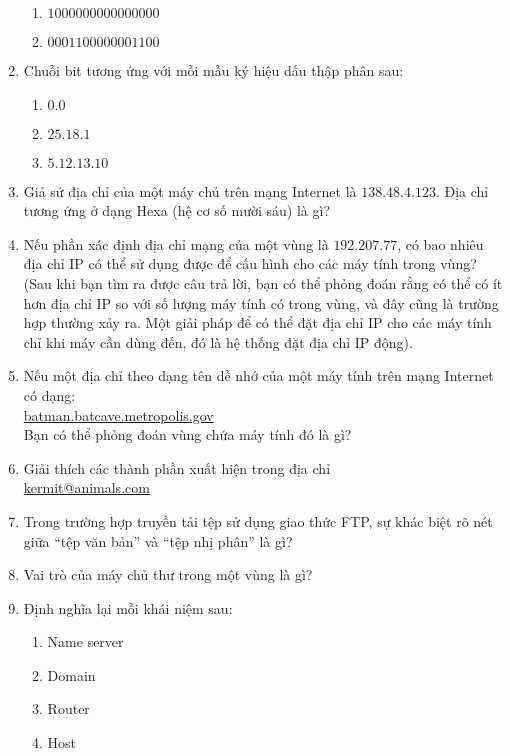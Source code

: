 \begin{multicols}{2}
\begin{enumerate}
\begin{enumerate}
    \item $1000000000000000$

    \item $0001100000001100$
    \end{enumerate}

  \item Chuỗi bit tương ứng với mỗi mẫu ký hiệu dấu thập phân sau:
    \begin{enumerate}
    \item $0.0$ 
    \item $25.18.1$
    \item $5.12.13.10$
    \end{enumerate}

  \item Giả sử địa chỉ của một máy chủ trên mạng Internet là $138.48.4.123$. Địa chỉ tương
    ứng ở dạng Hexa (hệ cơ số mười sáu) là gì?

  \item Nếu phần xác định địa chỉ mạng của một vùng là $192.207.77$, có bao nhiêu địa chỉ
    IP có thể sử dụng được để cấu hình cho các máy tính trong vùng? (Sau khi bạn tìm ra
    được câu trả lời, bạn có thể phỏng đoán rằng có thể có ít hơn địa chỉ IP so với số
    lượng máy tính có trong vùng, và đây cũng là trường hợp thường xảy ra. Một giải pháp
    để có thể đặt địa chỉ IP cho các máy tính chỉ khi máy cần dùng đến, đó là hệ thống đặt
    địa chỉ IP động).


  \item Nếu một địa chỉ theo dạng tên dễ nhớ của một máy tính trên mạng Internet có dạng:\\
    \url{batman.batcave.metropolis.gov}\\ Bạn có thể phỏng đoán vùng chứa máy tính đó là
    gì?


  \item Giải thích các thành phần xuất hiện trong địa chỉ\\ \url{kermit@animals.com}

  \item Trong trường hợp truyền tải tệp sử dụng giao thức FTP, sự khác biệt rõ nét giữa
    ``tệp văn bản'' và ``tệp nhị phân'' là gì?

  \item Vai trò của máy chủ thư trong một vùng là gì?

  \item Định nghĩa lại mỗi khái niệm sau:
    \begin{enumerate}
    \item Name server
    \item Domain
    \item Router
    \item Host
    \end{enumerate}


\end{enumerate}
\end{multicols}
